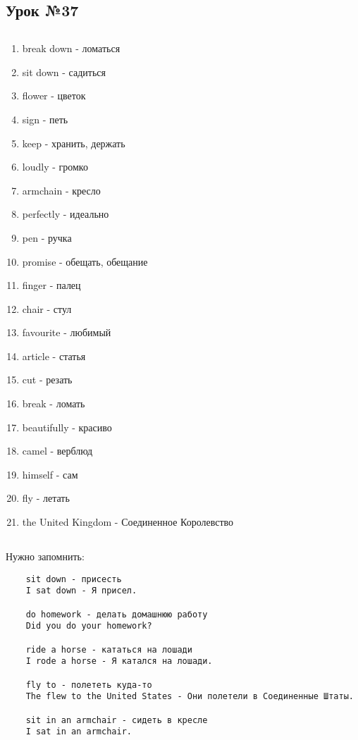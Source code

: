 \subsection{Урок №37}

\subsection*{}
\begin{multicols}{2}
    \begin{enumerate}\setlength{\itemsep}{0pt}
        \item break down - ломаться
        \item sit down - садиться
        \item flower - цветок
        \item sign - петь
        \item keep - хранить, держать
        \item loudly - громко
        \item armchain - кресло
        \item perfectly - идеально
        \item pen - ручка
        \item promise - обещать, обещание
        \item finger - палец
        \item chair - стул
        \item favourite - любимый
        \item article - статья
        \item cut - резать
        \item break - ломать
        \item beautifully - красиво
        \item camel - верблюд
        \item himself - сам
        \item fly - летать
        \item the United Kingdom - Соединенное Королевство
    \end{enumerate}
\end{multicols}

\subsection*{}
Нужно запомнить:
\begin{verbatim}
    sit down - присесть
    I sat down - Я присел.

    do homework - делать домашнюю работу
    Did you do your homework?

    ride a horse - кататься на лошади
    I rode a horse - Я катался на лошади.

    fly to - полететь куда-то
    The flew to the United States - Они полетели в Соединенные Штаты.

    sit in an armchair - сидеть в кресле
    I sat in an armchair.
\end{verbatim}